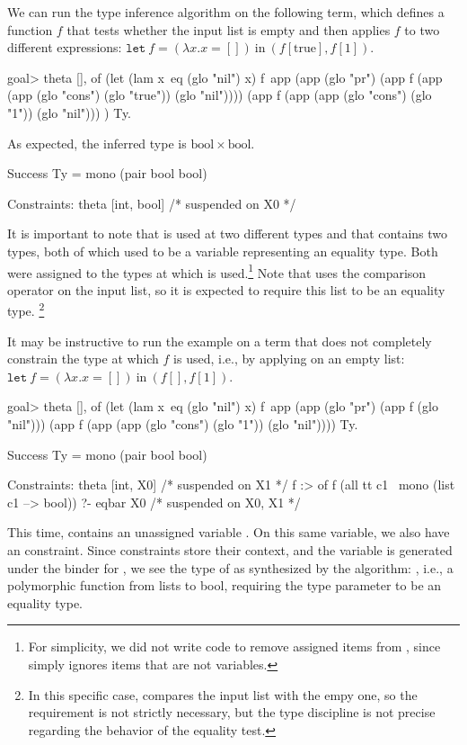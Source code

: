 \documentclass{these-ISSS}
\newenvironment{elpioutput}
  {\VerbatimEnvironment\begin{outputbox}\begin{xelpicode}}{\end{xelpicode}
\end{outputbox}}
\begin{document}
We can run the type inference algorithm on the following term, which defines a
function $f$ that tests whether the input list is empty and then applies $f$ to
two different expressions:
$
\mathtt{let}\ f = (\lambda x. x = [])\ \mathrm{in}\ (f [\mathrm{true}], f [1])
$.
\begin{elpioutput}
goal> theta [],
  of (let (lam x\ eq (glo "nil") x) f\
       app (app (glo "pr")
        (app f (app (app (glo "cons") (glo "true")) (glo "nil"))))
        (app f (app (app (glo "cons") (glo "1"))    (glo "nil")))
     ) Ty.
\end{elpioutput}
\noindent
As expected, the inferred type is $\mathrm{bool} \times \mathrm{bool}$.
\begin{elpioutput}
Success
  Ty = mono (pair bool bool)
 
Constraints:
  theta [int, bool]  /* suspended on X0 */
\end{elpioutput}
It is important to note that  is used at two different types and that
\elpi{theta} contains two types, both of which used to be a variable representing an
equality type. Both were assigned to the types at which \elpi{f} is used.\footnote{
For simplicity, we did not write code to remove assigned items from
\elpi{theta}, since \elpi{bind} simply ignores items that are not variables.}
Note that \elpi{f} uses the comparison operator on the input list, so it is
expected to require this list to be an equality type.
\footnote{In this specific
case,  compares the input list with the empy one, so the requirement is
not strictly necessary, but the type discipline is not precise regarding the
behavior of the equality test.}

It may be instructive to run the example on a term that does not completely
constrain the type at which $f$ is used, i.e., by applying \elpi{f} on an empty list:
$
\mathtt{let}\ f = (\lambda x. x = [])\ \mathrm{in}\ (f [], f [1])
$.
\begin{elpioutput}
goal> theta [],
  of (let (lam x\ eq (glo "nil") x) f\
        app (app (glo "pr")
          (app f (glo "nil")))
          (app f (app (app (glo "cons") (glo "1")) (glo "nil"))))
     Ty.

Success
  Ty = mono (pair bool bool)
 
Constraints:
 theta [int, X0] 
   /* suspended on X1 */
 {f} :> of f (all tt c1 \ mono (list c1 --> bool)) ?- eqbar X0 
   /* suspended on X0, X1 */
\end{elpioutput}
This time,  contains an unassigned variable . On this same
variable, we also have an  constraint. Since constraints store their
context, and the variable is generated under the binder for \elpi{f}, we see
the type of \elpi{f} as synthesized by the algorithm: \ocaml{''a list -> bool},
i.e., a polymorphic function from lists to bool, requiring the type parameter to
be an equality type.
~\\
\end{document}
